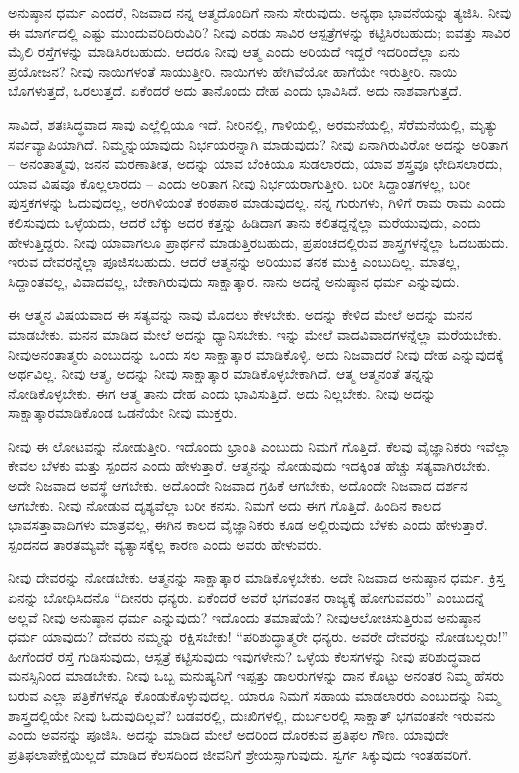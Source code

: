 ಅನುಷ್ಠಾನ ಧರ್ಮ ಎಂದರೆ, ನಿಜವಾದ ನನ್ನ ಆತ್ಮದೊಂದಿಗೆ ನಾನು ಸೇರುವುದು. ಅನ್ಯಥಾ ಭಾವನೆಯನ್ನು ತ್ಯಜಿಸಿ. ನೀವು ಈ ಮಾರ್ಗದಲ್ಲಿ ಎಷ್ಟು ಮುಂದುವರಿದಿರುವಿರಿ? ನೀವು ಎರಡು ಸಾವಿರ ಆಸ್ಪತ್ರೆಗಳನ್ನು ಕಟ್ಟಿಸಿರಬಹುದು; ಐವತ್ತು ಸಾವಿರ ಮೈಲಿ ರಸ್ತೆಗಳನ್ನು ಮಾಡಿಸಿರಬಹುದು. ಆದರೂ ನೀವು ಆತ್ಮ ಎಂದು ಅರಿಯದೆ ಇದ್ದರೆ ಇದರಿಂದೆಲ್ಲಾ ಏನು ಪ್ರಯೋಜನ? ನೀವು ನಾಯಿಗಳಂತೆ ಸಾಯುತ್ತೀರಿ. ನಾಯಿಗಳು ಹೇಗಿವೆಯೋ ಹಾಗೆಯೇ ಇರುತ್ತೀರಿ. ನಾಯಿ ಬೊಗಳುತ್ತದೆ, ಒರಲುತ್ತದೆ. ಏಕೆಂದರೆ ಅದು ತಾನೊಂದು ದೇಹ ಎಂದು ಭಾವಿಸಿದೆ. ಅದು ನಾಶವಾಗುತ್ತದೆ.

ಸಾವಿದೆ, ಶತಃಸಿದ್ಧವಾದ ಸಾವು ಎಲ್ಲೆಲ್ಲಿಯೂ ಇದೆ. ನೀರಿನಲ್ಲಿ, ಗಾಳಿಯಲ್ಲಿ, ಅರಮನೆಯಲ್ಲಿ, ಸೆರೆಮನೆಯಲ್ಲಿ, ಮೃತ್ಯು ಸರ್ವವ್ಯಾಪಿಯಾಗಿದೆ. ನಿಮ್ಮನ್ನು\break ಯಾವುದು ನಿರ್ಭಯರನ್ನಾಗಿ ಮಾಡುವುದು? ನೀವು ಏನಾಗಿರುವಿರೋ ಅದನ್ನು ಅರಿತಾಗ – ಅನಂತಾತ್ಮವು, ಜನನ ಮರಣಾತೀತ, ಅದನ್ನು ಯಾವ ಬೆಂಕಿಯೂ ಸುಡಲಾರದು, ಯಾವ ಶಸ್ತ್ರವೂ ಛೇದಿಸಲಾರದು, ಯಾವ ವಿಷವೂ ಕೊಲ್ಲಲಾರದು – ಎಂದು ಅರಿತಾಗ ನೀವು ನಿರ್ಭಯರಾಗುತ್ತೀರಿ. ಬರೀ ಸಿದ್ದಾಂತಗಳಲ್ಲ, ಬರೀ ಪುಸ್ತಕಗಳನ್ನು ಓದುವುದಲ್ಲ, ಅರಗಿಳಿಯಂತೆ ಕಂಠಪಾಠ ಮಾಡುವುದಲ್ಲ. ನನ್ನ ಗುರುಗಳು, ಗಿಳಿಗೆ ರಾಮ ರಾಮ ಎಂದು ಕಲಿಸುವುದು ಒಳ್ಳೆಯದು, ಆದರೆ ಬೆಕ್ಕು ಅದರ ಕತ್ತನ್ನು ಹಿಡಿದಾಗ ತಾನು ಕಲಿತದ್ದನ್ನೆಲ್ಲಾ ಮರೆಯುವುದು, ಎಂದು ಹೇಳುತ್ತಿದ್ದರು. ನೀವು ಯಾವಾಗಲೂ ಪ್ರಾರ್ಥನೆ ಮಾಡುತ್ತಿರಬಹುದು, ಪ್ರಪಂಚದಲ್ಲಿರುವ ಶಾಸ್ತ್ರಗಳನ್ನೆಲ್ಲಾ ಓದಬಹುದು. ಇರುವ ದೇವರನ್ನೆಲ್ಲಾ ಪೂಜಿಸಬಹುದು. ಆದರೆ ಆತ್ಮನನ್ನು ಅರಿಯುವ ತನಕ ಮುಕ್ತಿ ಎಂಬುದಿಲ್ಲ. ಮಾತಲ್ಲ, ಸಿದ್ದಾಂತವಲ್ಲ, ವಿವಾದವಲ್ಲ, ಬೇಕಾಗಿರುವುದು ಸಾಕ್ಷಾತ್ಕಾರ. ನಾನು ಅದನ್ನೆ ಅನುಷ್ಠಾನ ಧರ್ಮ ಎನ್ನುವುದು.

ಈ ಆತ್ಮನ ವಿಷಯವಾದ ಈ ಸತ್ಯವನ್ನು ನಾವು ಮೊದಲು ಕೇಳಬೇಕು. ಅದನ್ನು ಕೇಳಿದ ಮೇಲೆ ಅದನ್ನು ಮನನ ಮಾಡಬೇಕು. ಮನನ ಮಾಡಿದ ಮೇಲೆ ಅದನ್ನು ಧ್ಯಾನಿಸಬೇಕು. ಇನ್ನು ಮೇಲೆ ವಾದವಿವಾದಗಳನ್ನೆಲ್ಲಾ ಮರೆಯಬೇಕು. ನೀವು\break ಅನಂತಾತ್ಮರು ಎಂಬುದನ್ನು ಒಂದು ಸಲ ಸಾಕ್ಷಾತ್ಕಾರ ಮಾಡಿಕೊಳ್ಳಿ. ಅದು ನಿಜವಾದರೆ ನೀವು ದೇಹ ಎನ್ನುವುದಕ್ಕೆ ಅರ್ಥವಿಲ್ಲ. ನೀವು ಆತ್ಮ, ಅದನ್ನು ನೀವು ಸಾಕ್ಷಾತ್ಕಾರ ಮಾಡಿಕೊಳ್ಳಬೇಕಾಗಿದೆ. ಆತ್ಮ ಆತ್ಮನಂತೆ ತನ್ನನ್ನು ನೋಡಿಕೊಳ್ಳಬೇಕು. ಈಗ ಆತ್ಮ ತಾನು ದೇಹ ಎಂದು ಭಾವಿಸುತ್ತಿದೆ. ಅದು ನಿಲ್ಲಬೇಕು. ನೀವು ಅದನ್ನು ಸಾಕ್ಷಾತ್ಕಾರಮಾಡಿಕೊಂಡ ಒಡನೆಯೇ ನೀವು ಮುಕ್ತರು.

ನೀವು ಈ ಲೋಟವನ್ನು ನೋಡುತ್ತೀರಿ. ಇದೊಂದು ಭ್ರಾಂತಿ ಎಂಬುದು ನಿಮಗೆ ಗೊತ್ತಿದೆ. ಕೆಲವು ವೈಜ್ಞಾನಿಕರು ಇವೆಲ್ಲಾ ಕೇವಲ ಬೆಳಕು ಮತ್ತು ಸ್ಪಂದನ ಎಂದು ಹೇಳುತ್ತಾರೆ. ಆತ್ಮನನ್ನು ನೋಡುವುದು ಇದಕ್ಕಿಂತ ಹೆಚ್ಚು ಸತ್ಯವಾಗಿರಬೇಕು. ಅದೇ ನಿಜವಾದ ಅವಸ್ಥೆ ಆಗಬೇಕು. ಅದೊಂದೇ ನಿಜವಾದ ಗ್ರಹಿಕೆ ಆಗಬೇಕು, ಅದೊಂದೇ ನಿಜವಾದ ದರ್ಶನ ಆಗಬೇಕು. ನೀವು ನೋಡುವ ದೃಶ್ಯವೆಲ್ಲಾ ಬರೀ ಕನಸು. ನಿಮಗೆ ಅದು ಈಗ ಗೊತ್ತಿದೆ. ಹಿಂದಿನ ಕಾಲದ ಭಾವಸತ್ತಾವಾದಿಗಳು ಮಾತ್ರವಲ್ಲ, ಈಗಿನ ಕಾಲದ ವೈಜ್ಞಾನಿಕರು ಕೂಡ ಅಲ್ಲಿರುವುದು ಬೆಳಕು ಎಂದು ಹೇಳುತ್ತಾರೆ. ಸ್ಪಂದನದ ತಾರತಮ್ಯವೇ ವ್ಯತ್ಯಾಸಕ್ಕೆಲ್ಲ ಕಾರಣ ಎಂದು ಅವರು ಹೇಳುವರು.

ನೀವು ದೇವರನ್ನು ನೋಡಬೇಕು. ಆತ್ಮನನ್ನು ಸಾಕ್ಷಾತ್ಕಾರ ಮಾಡಿಕೊಳ್ಳಬೇಕು. ಅದೇ ನಿಜವಾದ ಅನುಷ್ಠಾನ ಧರ್ಮ. ಕ್ರಿಸ್ತ ಏನನ್ನು ಬೋಧಿಸಿದನೊ “ದೀನರು ಧನ್ಯರು. ಏಕೆಂದರೆ ಅವರೆ ಭಗವಂತನ ರಾಜ್ಯಕ್ಕೆ ಹೋಗುವವರು'' ಎಂಬುದನ್ನೆ ಅಲ್ಲವೆ ನೀವು ಅನುಷ್ಠಾನ ಧರ್ಮ ಎನ್ನುವುದು? ಇದೊಂದು ತಮಾಷೆಯೆ? ನೀವು\break ಆಲೋಚಿಸುತ್ತಿರುವ ಅನುಷ್ಠಾನ ಧರ್ಮ ಯಾವುದು? ದೇವರು ನಮ್ಮನ್ನು ರಕ್ಷಿಸಬೇಕು! “ಪರಿಶುದ್ಧಾತ್ಮರೇ ಧನ್ಯರು. ಅವರೇ ದೇವರನ್ನು ನೋಡಬಲ್ಲರು!” ಹೀಗೆಂದರೆ ರಸ್ತೆ ಗುಡಿಸುವುದು, ಆಸ್ಪತ್ರೆ ಕಟ್ಟಿಸುವುದು ಇವುಗಳೇನು? ಒಳ್ಳೆಯ ಕೆಲಸಗಳನ್ನು ನೀವು ಪರಿಶುದ್ಧವಾದ ಮನಸ್ಸಿನಿಂದ ಮಾಡಬೇಕು. ನೀವು ಒಬ್ಬ ಮನುಷ್ಯನಿಗೆ ಇಪ್ಪತ್ತು ಡಾಲರುಗಳನ್ನು ದಾನ ಕೊಟ್ಟು ಅನಂತರ ನಿಮ್ಮ ಹೆಸರು ಬರುವ ಎಲ್ಲಾ ಪತ್ರಿಕೆಗಳನ್ನೂ ಕೊಂಡುಕೊಳ್ಳುವುದಲ್ಲ. ಯಾರೂ ನಿಮಗೆ ಸಹಾಯ ಮಾಡಲಾರರು ಎಂಬುದನ್ನು ನಿಮ್ಮ ಶಾಸ್ತ್ರದಲ್ಲಿಯೇ ನೀವು ಓದುವುದಿಲ್ಲವೆ? ಬಡವರಲ್ಲಿ, ದುಃಖಿಗಳಲ್ಲಿ, ದುರ್ಬಲರಲ್ಲಿ ಸಾಕ್ಷಾತ್ ಭಗವಂತನೇ ಇರುವನು ಎಂದು ಅವನನ್ನು ಪೂಜಿಸಿ. ಅದನ್ನು ಮಾಡಿದ ಮೇಲೆ ಅದರಿಂದ ದೊರಕುವ ಪ್ರತಿಫಲ ಗೌಣ. ಯಾವುದೇ ಪ್ರತಿಫಲಾಪೇಕ್ಷೆಯಿಲ್ಲದೆ ಮಾಡಿದ ಕೆಲಸದಿಂದ ಜೀವನಿಗೆ ಶ್ರೇಯಸ್ಸಾಗುವುದು. ಸ್ವರ್ಗ ಸಿಕ್ಕುವುದು ಇಂತಹವರಿಗೆ.

